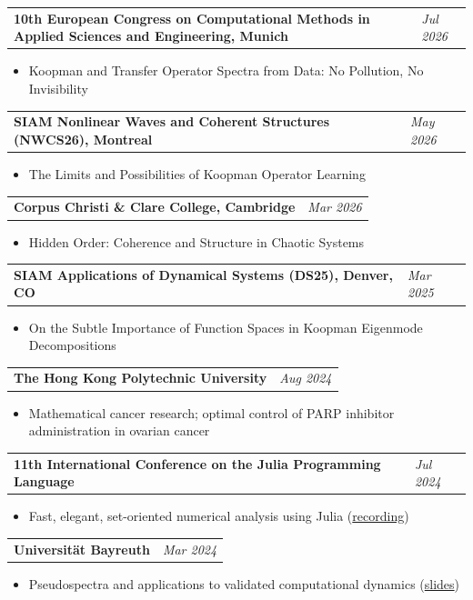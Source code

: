 \documentclass[10pt,a4paper]{article}
\makeatletter
\newcommand{\datedentry}[2]{%
    \begin{tabularx}{\textwidth}{@{}X>{\raggedleft\arraybackslash}p{4cm}@{}}
        #1 & \textit{#2}
    \end{tabularx}%
}
\makeatother
\begin{document}
\datedentry{\textbf{10th European Congress on Computational Methods in Applied Sciences and Engineering, Munich}}{Jul 2026}
\begin{itemize}
    \item Koopman and Transfer Operator Spectra from Data: No Pollution, No Invisibility
\end{itemize}

\datedentry{\textbf{SIAM Nonlinear Waves and Coherent Structures (NWCS26), Montreal}}{May 2026}
\begin{itemize}
    \item The Limits and Possibilities of Koopman Operator Learning
\end{itemize}

\datedentry{\textbf{Corpus Christi \& Clare College, Cambridge}}{Mar 2026}
\begin{itemize}
    \item Hidden Order: Coherence and Structure in Chaotic Systems
\end{itemize}

\datedentry{\textbf{SIAM Applications of Dynamical Systems (DS25), Denver, CO}}{Mar 2025}
\begin{itemize}
    \item On the Subtle Importance of Function Spaces in Koopman Eigenmode Decompositions
\end{itemize}

\datedentry{\textbf{The Hong Kong Polytechnic University}}{Aug 2024}
\begin{itemize}
    \item Mathematical cancer research; optimal control of PARP inhibitor administration in ovarian cancer
\end{itemize}

\smallskip
\datedentry{\textbf{11th International Conference on the Julia Programming Language}}{Jul 2024}
\begin{itemize}
    \item Fast, elegant, set-oriented numerical analysis using Julia
    (\href{https://youtu.be/iQrVzOOJo6Y?si=IyniAxC5gF5Np9SJ}{recording})
\end{itemize}

\smallskip
\datedentry{\textbf{Universität Bayreuth}}{Mar 2024}
\begin{itemize}
    \item Pseudospectra and applications to validated computational dynamics
    (\href{https://github.com/April-Hannah-Lena/talk_GAIO.jl/blob/main/pseudospectrum.pdf}{slides})
\end{itemize}
\end{document}
